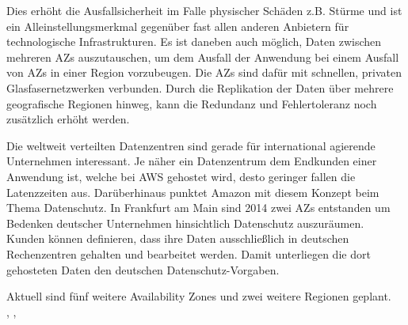 Dies erhöht die Ausfallsicherheit im Falle physischer Schäden z.B. Stürme und ist ein Alleinstellungsmerkmal gegenüber fast allen anderen Anbietern für technologische Infrastrukturen. Es ist daneben auch möglich, Daten zwischen mehreren AZs auszutauschen, um dem Ausfall der Anwendung bei einem Ausfall von AZs in einer Region vorzubeugen. Die AZs sind dafür mit schnellen, privaten Glasfasernetzwerken verbunden.
Durch die Replikation der Daten über mehrere geografische Regionen hinweg, kann die Redundanz und Fehlertoleranz noch zusätzlich erhöht werden.

Die weltweit verteilten Datenzentren sind gerade für international agierende Unternehmen interessant. Je näher ein Datenzentrum dem Endkunden einer Anwendung ist, welche bei AWS gehostet wird, desto geringer fallen die Latenzzeiten aus. Darüberhinaus punktet Amazon mit diesem Konzept beim Thema Datenschutz. In Frankfurt am Main sind 2014 zwei AZs entstanden um Bedenken deutscher Unternehmen hinsichtlich Datenschutz auszuräumen. Kunden können definieren, dass ihre Daten ausschließlich in deutschen Rechenzentren gehalten und bearbeitet werden. Damit unterliegen die dort gehosteten Daten den deutschen Datenschutz-Vorgaben.

Aktuell sind fünf weitere Availability Zones und zwei weitere Regionen geplant.
\\ \cite{computerwoche:reder}, \cite{aws:regions}, \cite{aws:azs}


